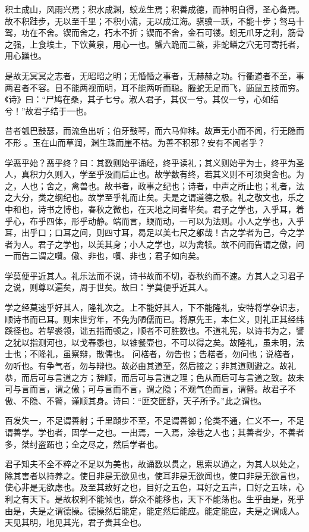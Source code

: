 积土成山，风雨兴焉；积水成渊，蛟龙生焉；积善成德，而神明自得，圣心备焉。故不积跬步，无以至千里；不积小流，无以成江海。骐骥一跃，不能十步；驽马十驾，功在不舍。锲而舍之，朽木不折；锲而不舍，金石可镂。蚓无爪牙之利，筋骨之强，上食埃土，下饮黄泉，用心一也。蟹六跪而二螯，非蛇鳝之穴无可寄托者，用心躁也。

是故无冥冥之志者，无昭昭之明；无惛惛之事者，无赫赫之功。行衢道者不至，事两君者不容。目不能两视而明，耳不能两听而聪。螣蛇无足而飞，鼫鼠五技而穷。《诗》曰：“尸鸠在桑，其子七兮。淑人君子，其仪一兮。其仪一兮，心如结兮！”故君子结于一也。

昔者瓠巴鼓瑟，而流鱼出听；伯牙鼓琴，而六马仰秣。故声无小而不闻，行无隐而不形 。玉在山而草润，渊生珠而崖不枯。为善不积邪？安有不闻者乎？

学恶乎始？恶乎终？曰：其数则始乎诵经，终乎读礼；其义则始乎为士，终乎为圣人，真积力久则入，学至乎没而后止也。故学数有终，若其义则不可须臾舍也。为之，人也；舍之，禽兽也。故书者，政事之纪也；诗者，中声之所止也；礼者，法之大分，类之纲纪也。故学至乎礼而止矣。夫是之谓道德之极。礼之敬文也，乐之中和也，诗书之博也，春秋之微也，在天地之间者毕矣。君子之学也，入乎耳，着乎心，布乎四体，形乎动静。端而言，蝡而动，一可以为法则。小人之学也，入乎耳，出乎口；口耳之间，则四寸耳，曷足以美七尺之躯哉！古之学者为己，今之学者为人。君子之学也，以美其身；小人之学也，以为禽犊。故不问而告谓之傲，问一而告二谓之囋。傲、非也，囋、非也；君子如向矣。
 
学莫便乎近其人。礼乐法而不说，诗书故而不切，春秋约而不速。方其人之习君子之说，则尊以遍矣，周于世矣。故曰：学莫便乎近其人。

学之经莫速乎好其人，隆礼次之。上不能好其人，下不能隆礼，安特将学杂识志，顺诗书而已耳。则末世穷年，不免为陋儒而已。将原先王，本仁义，则礼正其经纬蹊径也。若挈裘领，诎五指而顿之，顺者不可胜数也。不道礼宪，以诗书为之，譬之犹以指测河也，以戈舂黍也，以锥餐壶也，不可以得之矣。故隆礼，虽未明，法士也；不隆礼，虽察辩，散儒也。
问楛者，勿告也；告楛者，勿问也；说楛者，勿听也。有争气者，勿与辩也。故必由其道至，然后接之；非其道则避之。故礼恭，而后可与言道之方；辞顺，而后可与言道之理；色从而后可与言道之致。故未可与言而言，谓之傲；可与言而不言，谓之隐；不观气色而言，谓瞽。故君子不傲、不隐、不瞽，谨顺其身。诗曰：“匪交匪舒，天子所予。”此之谓也。

百发失一，不足谓善射；千里蹞步不至，不足谓善御；伦类不通，仁义不一，不足谓善学。学也者，固学一之也。一出焉，一入焉，涂巷之人也；其善者少，不善者多，桀纣盗跖也；全之尽之，然后学者也。

君子知夫不全不粹之不足以为美也，故诵数以贯之，思索以通之，为其人以处之，除其害者以持养之。使目非是无欲见也，使耳非是无欲闻也，使口非是无欲言也，使心非是无欲虑也。及至其致好之也，目好之五色，耳好之五声，口好之五味，心利之有天下。是故权利不能倾也，群众不能移也，天下不能荡也。生乎由是，死乎由是，夫是之谓德操。德操然后能定，能定然后能应。能定能应，夫是之谓成人。天见其明，地见其光，君子贵其全也。